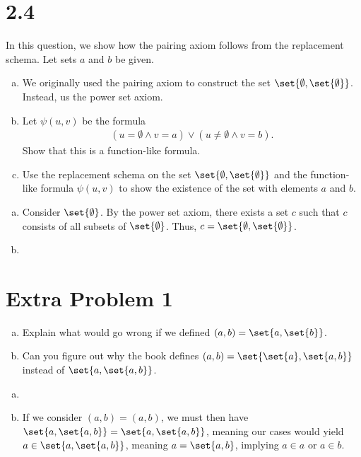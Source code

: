 \documentclass[10pt]{mypackage}
\begin{document}
\section{2.4}%
\begin{problem}
  In this question, we show how the pairing axiom follows from the replacement schema. Let sets $a$ and $b$ be given.
  \begin{enumerate}[(a)]
    \item We originally used the pairing axiom to construct the set $\set{\emptyset,\set{\emptyset}}$. Instead, us the power set axiom.
    \item Let $\psi(u,v)$ be the formula
      \begin{align*}
        \left(u=\emptyset \wedge v = a\right)\vee \left(u \neq \emptyset \wedge v = b\right).
      \end{align*}
      Show that this is a function-like formula.
    \item Use the replacement schema on the set $\set{\emptyset,\set{\emptyset}}$ and the function-like formula $\psi\left(u,v\right)$ to show the existence of the set with elements $a$ and $b$.
  \end{enumerate}
\end{problem}
\begin{solution}\hfill
  \begin{enumerate}[(a)]
    \item Consider $\set{\emptyset}$. By the power set axiom, there exists a set $c$ such that $c$ consists of all subsets of $\set{\emptyset}$. Thus, $c = \set{\emptyset,\set{\emptyset}}$.
    \item 
  \end{enumerate}
\end{solution}
\section{Extra Problem 1}%
\begin{problem}\hfill
  \begin{enumerate}[(a)]
    \item Explain what would go wrong if we defined $(a,b) = \set{a,\set{b}}$.
    \item Can you figure out why the book defines $(a,b) = \set{\set{a},\set{a,b}}$ instead of $\set{a,\set{a,b}}$.
  \end{enumerate}
\end{problem}
\begin{solution}\hfill
  \begin{enumerate}[(a)]
    \item 
    \item If we consider $(a,b) = (a,b)$, we must then have $\set{a,\set{a,b}} = \set{a,\set{a,b}}$, meaning our cases would yield $a\in \set{a,\set{a,b}}$, meaning $a = \set{a,b}$, implying $a\in a$ or $a\in b$.
  \end{enumerate}
\end{solution}
\end{document}
